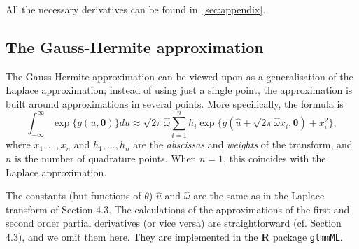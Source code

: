 \documentclass[a4paper,11pt]{article}
\newcommand{\btheta}{\ensuremath{\boldsymbol{\theta}}}
\begin{document}
All the necessary derivatives can be found in~\ref{sec:appendix}. 

\subsection{The Gauss-Hermite approximation}

The Gauss-Hermite approximation can be viewed upon as a generalisation of
the Laplace approximation; instead of using just a single point, the
approximation is built around approximations in several points. More
specifically, the formula is 
\begin{equation}\label{eq:gh}
\int_{-\infty}^{\infty} \exp\{g(u, \btheta)\} du \approx
\sqrt{2\pi}\hat{\omega}\sum_{i=1}^nh_i \exp\{g(\hat{u} + \sqrt{2\pi}\hat{\omega}
x_i, \btheta) + x_i^2\}, 
\end{equation}
where $x_1, \ldots, x_n$ and $h_1, \ldots, h_n$ are the \emph{abscissas}
and \emph{weights} of the transform, and $n$ is the number of quadrature
points. When $n = 1$, this coincides with the Laplace approximation.

The constants (but functions of $\theta$) $\hat{u}$ and $\hat{\omega}$ are
the same as in the Laplace transform of Section 4.3. The calculations of
the approximations of the first and second order partial derivatives (or
vice versa) are straightforward (cf. Section 4.3), and we omit them here. 
They are implemented in the {\bf R} package {\tt glmmML}.





\end{document}
